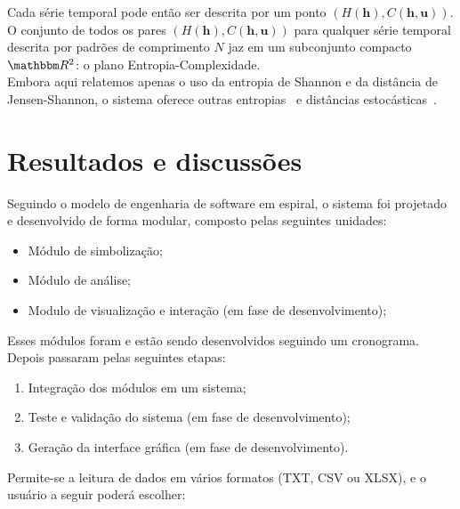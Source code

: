 \documentclass[a0,portrait]{sciposter}
\begin{document}
\begin{multicols}{2}
Cada série temporal pode então ser descrita por um ponto $(H(\bm h), C(\bm h, \bm u))$.
O conjunto de todos os pares $(H(\bm h), C(\bm h, \bm u))$ para qualquer série temporal descrita por padrões de comprimento $N$ jaz em um subconjunto compacto $\mathbbm R^2$: o plano Entropia-Complexidade.\\

Embora aqui relatemos apenas o uso da entropia de Shannon e da distância de Jensen-Shannon, o sistema oferece outras entropias~\cite{salicruetal1993} e distâncias estocásticas~\cite{StatisticalInferenceBasedonDivergenceMeasures}.


\section*{Resultados e discussões}
\quad Seguindo o modelo de engenharia de software em espiral, o sistema foi projetado e desenvolvido de forma modular, composto pelas seguintes unidades:

\begin{itemize}[leftmargin=1.0in]
\item Módulo de simbolização;
\item Módulo de análise;
\item Modulo de visualização e interação (em fase de desenvolvimento);
\end{itemize} 

Esses módulos foram e estão sendo desenvolvidos seguindo um cronograma. Depois passaram pelas seguintes etapas:
\begin{enumerate}[leftmargin=1.0in]
\item Integração dos módulos em um sistema;
\item Teste e validação do sistema (em fase de desenvolvimento);
\item Geração da interface gráfica (em fase de desenvolvimento).
\end{enumerate}

Permite-se a leitura de dados em vários formatos (TXT, CSV ou XLSX), e o usuário a seguir poderá escolher:


\end{multicols}
\end{document}
